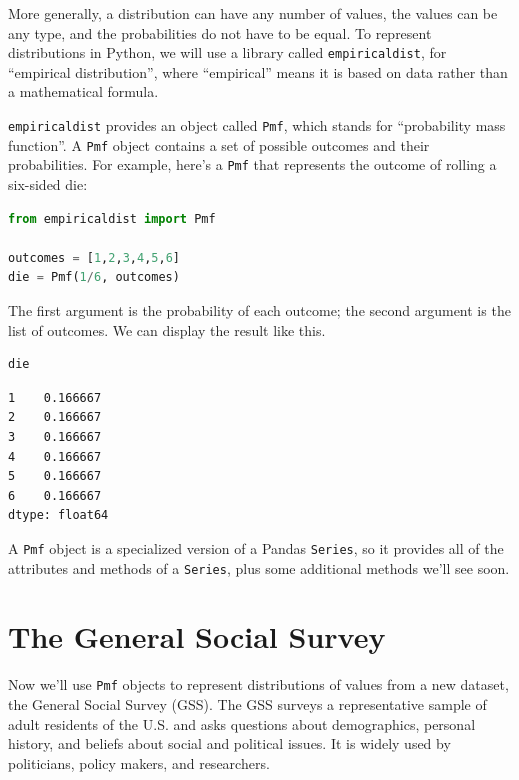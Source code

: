 More generally, a distribution can have any number of values, the values
can be any type, and the probabilities do not have to be equal. To
represent distributions in Python, we will use a library called
\passthrough{\lstinline!empiricaldist!}, for ``empirical distribution'',
where ``empirical'' means it is based on data rather than a mathematical
formula.

\passthrough{\lstinline!empiricaldist!} provides an object called
\passthrough{\lstinline!Pmf!}, which stands for ``probability mass
function''. A \passthrough{\lstinline!Pmf!} object contains a set of
possible outcomes and their probabilities. For example, here's a
\passthrough{\lstinline!Pmf!} that represents the outcome of rolling a
six-sided die:

\begin{lstlisting}[language=Python,style=source]
from empiricaldist import Pmf

outcomes = [1,2,3,4,5,6]
die = Pmf(1/6, outcomes)
\end{lstlisting}

The first argument is the probability of each outcome; the second
argument is the list of outcomes. We can display the result like this.

\begin{lstlisting}[language=Python,style=source]
die
\end{lstlisting}

\begin{lstlisting}[style=output]
1    0.166667
2    0.166667
3    0.166667
4    0.166667
5    0.166667
6    0.166667
dtype: float64
\end{lstlisting}

A \passthrough{\lstinline!Pmf!} object is a specialized version of a
Pandas \passthrough{\lstinline!Series!}, so it provides all of the
attributes and methods of a \passthrough{\lstinline!Series!}, plus some
additional methods we'll see soon.

\hypertarget{the-general-social-survey}{%
\section{The General Social Survey}\label{the-general-social-survey}}

Now we'll use \passthrough{\lstinline!Pmf!} objects to represent
distributions of values from a new dataset, the General Social Survey
(GSS). The GSS surveys a representative sample of adult residents of the
U.S. and asks questions about demographics, personal history, and
beliefs about social and political issues. It is widely used by
politicians, policy makers, and researchers.

